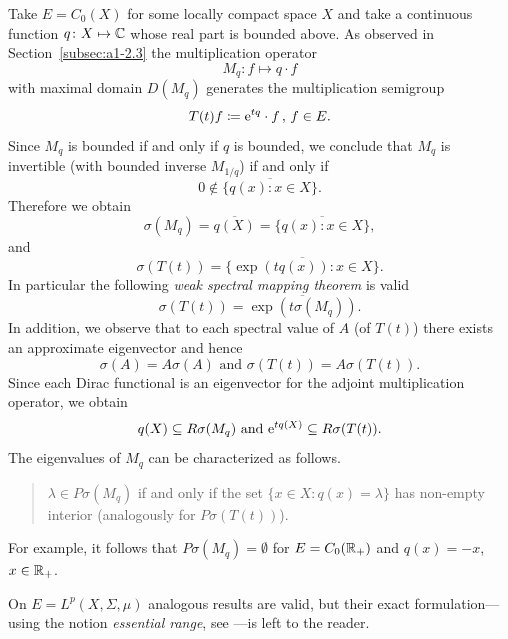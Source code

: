 \begin{example}\label{ex:a3-2.3}%
Take $E = C_{0}(X)$ for some locally compact space $X$ and take a continuous function $q \colon X \mapsto \mathbb{C}$ whose real part is bounded above.
As observed in Section~\ref{subsec:a1-2.3} the multiplication operator
\[
M_{q} \colon f \mapsto q \cdot f
\]
with maximal domain $D(M_{q})$ generates the multiplication semigroup
\[
T(t)f \coloneq \mathrm{e}^{tq} \cdot f \, , \, f \in E .
\]
Since $M_{q}$ is bounded if and only if\/ $q$ is bounded, we conclude that $M_{q}$ is invertible (with bounded inverse $M_{1/q}$) if and only if
\[
0 \notin \overline{\{q(x)  \colon x \in X\}} .
\]
Therefore we obtain
\[
\sigma(M_{q}) = \overline{q(X)} = \overline{\{q(x) \colon x \in X\}} ,
\]
and
\[
\sigma(T(t)) = \overline{\{\exp(tq(x)) \colon x \in X\}} .
\]
In particular the following \emph{weak spectral mapping theorem}
is valid
\[
\sigma(T(t)) = \overline{\exp(t\sigma(M_{q}))} .
\]
In addition, we observe that to each spectral value of\/ $A$ (\resp of\/ $T(t)$) there exists an approximate eigenvector and hence
\[
\sigma(A) = A\sigma(A) \text{ and } \sigma(T(t)) = A\sigma(T(t)) .
\]
Since each Dirac functional is an eigenvector for the adjoint multiplication operator, we obtain
\[
q(X) \subseteq R\sigma(M_{q}) \text{ and } \mathrm{e}^{tq(X)} \subseteq R\sigma(T(t)) .
\]
The eigenvalues of\/ $M_{q}$ can be characterized as follows.
\begin{quote}
$\lambda \in P\sigma(M_{q})$ if and only if the set $\{x \in X \colon q(x) = \lambda\}$ has non-empty interior (analogously for $P\sigma(T(t))$).
\end{quote}
For example, it follows that $P\sigma(M_{q}) = \emptyset$ for $E = C_{0}(\mathbb{R}_{+})$ and $q(x) = -x$, $x \in \mathbb{R}_{+}$.

On $E = L^{p}(X,\Sigma,\mu)$ analogous results are valid, but their exact formulation---using the notion \emph{essential range}, see \textcite{goldstein:1985a}---is left to the reader.
\end{example}
